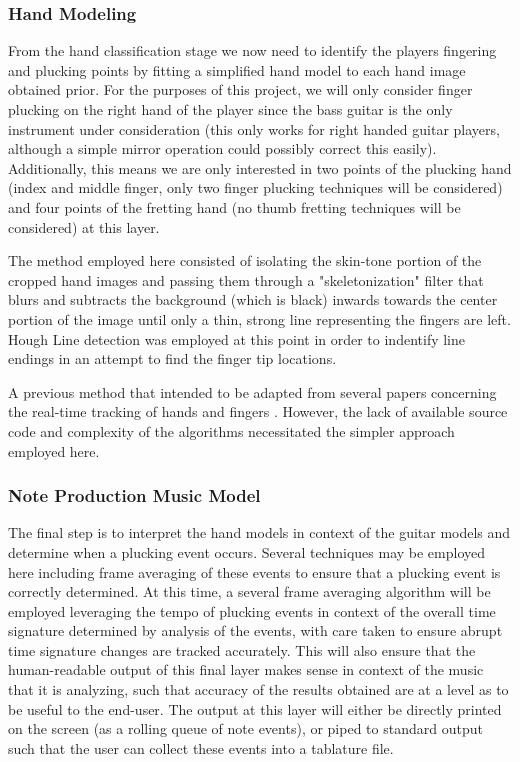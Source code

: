 \subsubsection{Hand Modeling}
From the hand classification stage we now need to identify the players fingering and plucking points
by fitting a simplified hand model to each hand image obtained prior.
For the purposes of this project, we will only consider finger plucking on the right hand of the player
since the bass guitar is the only instrument under consideration
(this only works for right handed guitar players, although a simple mirror operation could possibly correct this easily).
Additionally, this means we are only interested in two points of the plucking hand
(index and middle finger, only two finger plucking techniques will be considered)
and four points of the fretting hand (no thumb fretting techniques will be considered) at this layer.
\par
The method employed here consisted of isolating the skin-tone portion of the cropped hand images \cite{pyimagesearch,seereality}
and passing them through a "skeletonization" filter \cite{skeleton} that blurs and subtracts the background (which is black)
inwards towards the center portion of the image until only a thin, strong line representing the fingers are left.
Hough Line detection was employed at this point in order to indentify line endings in an attempt to find the finger tip locations.
\par
A previous method that intended to be adapted from several papers concerning the real-time tracking of hands and fingers
\cite{aslhand,handposes,fingertracking}.
However, the lack of available source code and complexity of the algorithms necessitated the simpler approach employed here.

\subsubsection{Note Production Music Model}
The final step is to interpret the hand models in context of the guitar models and determine when a plucking event occurs.
Several techniques may be employed here including frame averaging of these events to ensure that a plucking event
is correctly determined.
At this time, a several frame averaging algorithm will be employed leveraging the tempo of plucking events in context of 
the overall time signature determined by analysis of the events, with care taken to ensure abrupt time signature changes
are tracked accurately.
This will also ensure that the human-readable output of this final layer makes sense in context of the music that it is
analyzing, such that accuracy of the results obtained are at a level as to be useful to the end-user.
The output at this layer will either be directly printed on the screen (as a rolling queue of note events),
or piped to standard output such that the user can collect these events into a tablature file.

